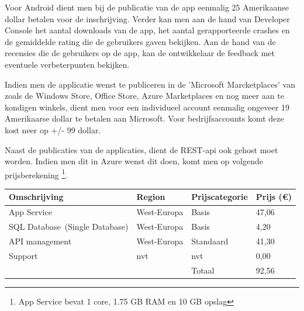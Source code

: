 Voor Android dient men bij de publicatie van de app \citep{getstartedwithpublishingandroiddevelopers2017} eenmalig 25 Amerikaanse dollar betalen voor de inschrijving.
Verder kan men aan de hand van Developer Console het aantal downloads van de app, het aantal gerapporteerde crashes en de gemiddelde rating die de gebruikers gaven bekijken.
Aan de hand van de recensies die de gebruikers op de app, kan de ontwikkelaar de feedback met eventuele verbeterpunten bekijken.

Indien men de applicatie wenst te publiceren in de 'Microsoft Marcketplaces' van \cite{registerasanappdeveloper2017}
 zoals de Windows Store, Office Store, Azure Marketplaces en nog meer aan te kondigen winkels, dient men voor een individueel account
 eenmalig ongeveer 19 Amerikaarse dollar te betalen aan Microsoft. Voor bedrijfsaccounts komt deze kost neer op +/- 99 dollar.

Naast de publicaties van de applicaties, dient de REST-api ook gehost moet worden. Indien men dit in Azure wenst dit doen, komt men op volgende prijsberekening \footnote{App Service bevat 1 core, 1.75 GB RAM en 10 GB opslag}.

\begin{flushleft}
  \newline
  \begin{tabular}{ | l | l | l | l |}
  \hline
  Omschrijving & Region & Prijscategorie & Prijs (€)
  \\ \hline
  App Service & West-Europa & Basis & 47,06
  \\ \hline
  SQL Database (Single Database) & West-Europa & Basis & 4,20
  \\ \hline
  API management & West-Europa & Standaard & 41,30
  \\ \hline
  Support & nvt & nvt & 0,00
  \\ \hline
   & & Totaal & 92,56
  \\ \hline
  \end{tabular}
\end{flushleft}
